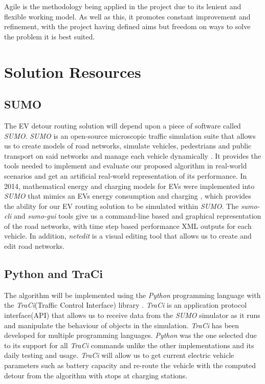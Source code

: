 \documentclass[11pt]{report}
\begin{document}
Agile is the methodology being applied in the project due to its lenient and flexible working model. As well as this, it promotes constant improvement and refinement, with the project having defined aims but freedom on ways to solve the problem it is best suited.

\section{Solution Resources}

\subsection{SUMO}

The EV detour routing solution will depend upon a piece of software called \emph{SUMO}. \emph{SUMO} is an open-source microscopic traffic simulation suite that allows us to create models of road networks, simulate vehicles, pedestrians and public transport on said networks and manage each vehicle dynamically \autocite{SUMO2018}. It provides the tools needed to implement and evaluate our proposed algorithm in real-world scenarios and get an artificial real-world representation of its performance. In 2014, mathematical energy and charging models for EVs were implemented into \emph{SUMO} that mimics an EVs energy consumption and charging \autocite{kurczveil2013implementation}, which provides the ability for our EV routing solution to be simulated within \emph{SUMO}. The \emph{sumo-cli} and \emph{sumo-gui} tools give us a command-line based and graphical representation of the road networks, with time step based performance XML outputs for each vehicle. In addition, \emph{netedit} is a visual editing tool that allows us to create and edit road networks.

\subsection{Python and TraCi}

The algorithm will be implemented using the \emph{Python} programming language with the \emph{TraCi}(Traffic Control Interface) library \autocite{van1991python} \autocite{traciPython}. \emph{TraCi} is an application protocol interface(API) that allows us to receive data from the \emph{SUMO} simulator as it runs and manipulate the behaviour of objects in the simulation. \emph{TraCi} has been developed for multiple programming languages. \emph{Python} was the one selected due to its support for all \emph{TraCi} commands unlike the other implementations and its daily testing and usage. \emph{TraCi} will allow us to get current electric vehicle parameters such as battery capacity and re-route the vehicle with the computed detour from the algorithm with stops at charging stations.
\end{document}
